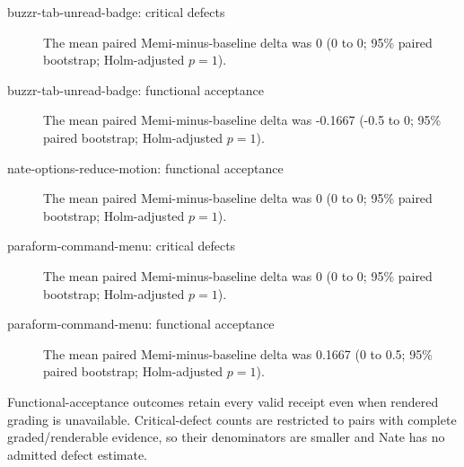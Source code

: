 \begin{description}
\item[buzzr-tab-unread-badge: critical defects] The mean paired Memi-minus-baseline delta was 0 (0 to 0; 95\% paired bootstrap; Holm-adjusted $p=1$).
\item[buzzr-tab-unread-badge: functional acceptance] The mean paired Memi-minus-baseline delta was -0.1667 (-0.5 to 0; 95\% paired bootstrap; Holm-adjusted $p=1$).
\item[nate-options-reduce-motion: functional acceptance] The mean paired Memi-minus-baseline delta was 0 (0 to 0; 95\% paired bootstrap; Holm-adjusted $p=1$).
\item[paraform-command-menu: critical defects] The mean paired Memi-minus-baseline delta was 0 (0 to 0; 95\% paired bootstrap; Holm-adjusted $p=1$).
\item[paraform-command-menu: functional acceptance] The mean paired Memi-minus-baseline delta was 0.1667 (0 to 0.5; 95\% paired bootstrap; Holm-adjusted $p=1$).
\end{description}
Functional-acceptance outcomes retain every valid receipt even when rendered grading is unavailable. Critical-defect counts are restricted to pairs with complete graded/renderable evidence, so their denominators are smaller and Nate has no admitted defect estimate.
